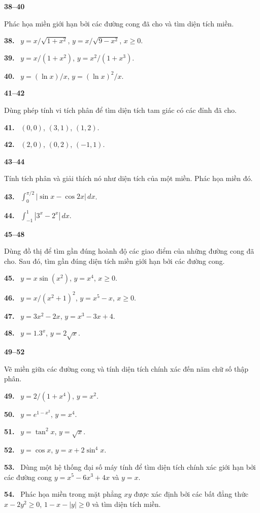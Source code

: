 \documentclass[12pt,a4paper]{article}
\newcommand{\bt}[1]{\par\smallskip\Needspace{5\baselineskip}\noindent\textbf{#1.}\ }
\newcommand{\group}[1]{\par\medskip\noindent\textbf{#1}\par\nopagebreak[4]}
\begin{document}
\group{38–40} Phác họa miền giới hạn bởi các đường cong đã cho và tìm diện tích miền.
\bt{38} $y=x/\sqrt{1+x^2}$, $y=x/\sqrt{9-x^2}$, $x\ge0$.
\bt{39} $y=x/(1+x^2)$, $y=x^2/(1+x^3)$.
\bt{40} $y=(\ln x)/x$, $y=(\ln x)^2/x$.
\group{41–42} Dùng phép tính vi tích phân để tìm diện tích tam giác có các đỉnh đã cho.
\bt{41} $(0,0)$, $(3,1)$, $(1,2)$.
\bt{42} $(2,0)$, $(0,2)$, $(-1,1)$.
\group{43–44} Tính tích phân và giải thích nó như diện tích của một miền. Phác họa miền đó.
\bt{43} $\displaystyle\int_0^{\pi/2}|\sin x-\cos2x|\,dx$.
\bt{44} $\displaystyle\int_{-1}^1|3^x-2^x|\,dx$.
\group{45–48} Dùng đồ thị để tìm gần đúng hoành độ các giao điểm của những đường cong đã cho. Sau đó, tìm gần đúng diện tích miền giới hạn bởi các đường cong.
\bt{45} $y=x\sin(x^2)$, $y=x^4$, $x\ge0$.
\bt{46} $y=x/(x^2+1)^2$, $y=x^5-x$, $x\ge0$.
\bt{47} $y=3x^2-2x$, $y=x^3-3x+4$.
\bt{48} $y=1.3^x$, $y=2\sqrt x$.
\group{49–52} Vẽ miền giữa các đường cong và tính diện tích chính xác đến năm chữ số thập phân.
\bt{49} $y=2/(1+x^4)$, $y=x^2$.
\bt{50} $y=e^{1-x^2}$, $y=x^4$.
\bt{51} $y=\tan^2x$, $y=\sqrt x$.
\bt{52} $y=\cos x$, $y=x+2\sin^4x$.
\bt{53} Dùng một hệ thống đại số máy tính để tìm diện tích chính xác giới hạn bởi các đường cong $y=x^5-6x^3+4x$ và $y=x$.
\bt{54} Phác họa miền trong mặt phẳng $xy$ được xác định bởi các bất đẳng thức $x-2y^2\ge0$, $1-x-|y|\ge0$ và tìm diện tích miền.
\end{document}
